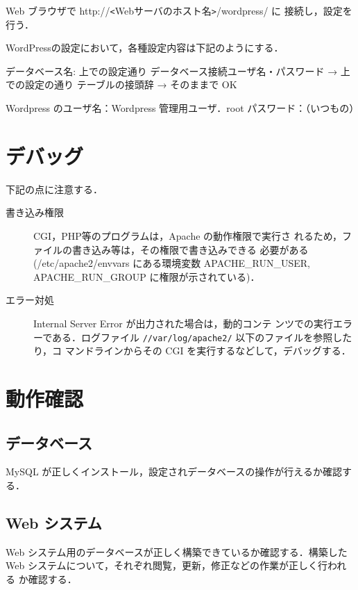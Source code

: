 Web ブラウザで http://\verb+<+Webサーバのホスト名\verb+>+/wordpress/ に
接続し，設定を行う．

WordPressの設定において，各種設定内容は下記のようにする．

\begin{cli}
データベース名: 上での設定通り
データベース接続ユーザ名・パスワード
  → 上での設定の通り
テーブルの接頭辞 → そのままで OK

Wordpress のユーザ名：Wordpress 管理用ユーザ．root
            パスワード：（いつもの）
\end{cli}


\section{デバッグ}

下記の点に注意する．

\begin{description}
\item[書き込み権限] CGI，PHP等のプログラムは，Apache の動作権限で実行さ
	    れるため，ファイルの書き込み等は，その権限で書き込みできる
	    必要がある(/etc/apache2/envvars にある環境変数
	    APACHE\_RUN\_USER, APACHE\_RUN\_GROUP に権限が示されている)．
 \item[エラー対処] Internal Server Error が出力された場合は，動的コンテ
	    ンツでの実行エラーである．ログファイル
	    \texttt{//var/log/apache2/} 以下のファイルを参照したり，コ
	    マンドラインからその CGI を実行するなどして，デバッグする．
\end{description}


\clearpage
\section{動作確認}

\subsection*{データベース}
MySQL が正しくインストール，設定されデータベースの操作が行えるか確認する．

%

\subsection*{Web システム}
Web システム用のデータベースが正しく構築できているか確認する．構築した 
Web システムについて，それぞれ閲覧，更新，修正などの作業が正しく行われる
か確認する．

